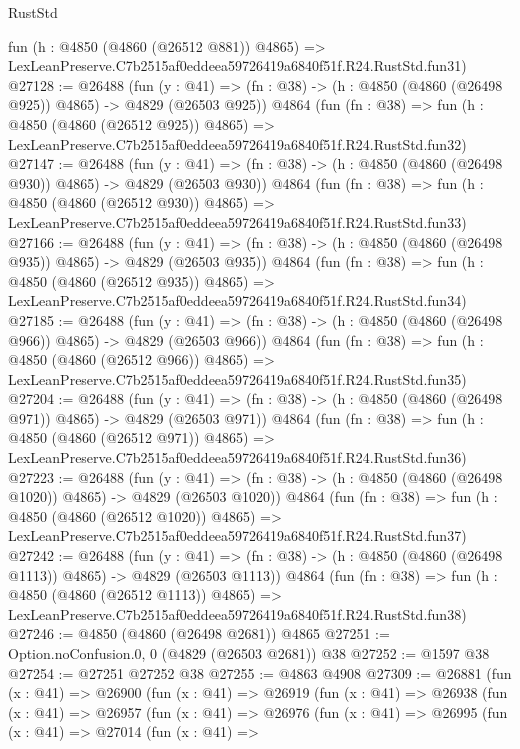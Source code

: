 \begin{lexlean}{RustStd}
\begin{coremodule}
    fun (h : @4850 (@4860 (@26512 @881)) @4865) =>
    LexLeanPreserve.C7b2515af0eddeea59726419a6840f51f.R24.RustStd.fun31)
@27128 := @26488
    (fun (y : @41) => (fn : @38) -> (h : @4850 (@4860 (@26498 @925)) @4865) -> @4829 (@26503 @925))
    @4864
    (fun (fn : @38) =>
    fun (h : @4850 (@4860 (@26512 @925)) @4865) =>
    LexLeanPreserve.C7b2515af0eddeea59726419a6840f51f.R24.RustStd.fun32)
@27147 := @26488
    (fun (y : @41) => (fn : @38) -> (h : @4850 (@4860 (@26498 @930)) @4865) -> @4829 (@26503 @930))
    @4864
    (fun (fn : @38) =>
    fun (h : @4850 (@4860 (@26512 @930)) @4865) =>
    LexLeanPreserve.C7b2515af0eddeea59726419a6840f51f.R24.RustStd.fun33)
@27166 := @26488
    (fun (y : @41) => (fn : @38) -> (h : @4850 (@4860 (@26498 @935)) @4865) -> @4829 (@26503 @935))
    @4864
    (fun (fn : @38) =>
    fun (h : @4850 (@4860 (@26512 @935)) @4865) =>
    LexLeanPreserve.C7b2515af0eddeea59726419a6840f51f.R24.RustStd.fun34)
@27185 := @26488
    (fun (y : @41) => (fn : @38) -> (h : @4850 (@4860 (@26498 @966)) @4865) -> @4829 (@26503 @966))
    @4864
    (fun (fn : @38) =>
    fun (h : @4850 (@4860 (@26512 @966)) @4865) =>
    LexLeanPreserve.C7b2515af0eddeea59726419a6840f51f.R24.RustStd.fun35)
@27204 := @26488
    (fun (y : @41) => (fn : @38) -> (h : @4850 (@4860 (@26498 @971)) @4865) -> @4829 (@26503 @971))
    @4864
    (fun (fn : @38) =>
    fun (h : @4850 (@4860 (@26512 @971)) @4865) =>
    LexLeanPreserve.C7b2515af0eddeea59726419a6840f51f.R24.RustStd.fun36)
@27223 := @26488
    (fun (y : @41) =>
    (fn : @38) -> (h : @4850 (@4860 (@26498 @1020)) @4865) -> @4829 (@26503 @1020))
    @4864
    (fun (fn : @38) =>
    fun (h : @4850 (@4860 (@26512 @1020)) @4865) =>
    LexLeanPreserve.C7b2515af0eddeea59726419a6840f51f.R24.RustStd.fun37)
@27242 := @26488
    (fun (y : @41) =>
    (fn : @38) -> (h : @4850 (@4860 (@26498 @1113)) @4865) -> @4829 (@26503 @1113))
    @4864
    (fun (fn : @38) =>
    fun (h : @4850 (@4860 (@26512 @1113)) @4865) =>
    LexLeanPreserve.C7b2515af0eddeea59726419a6840f51f.R24.RustStd.fun38)
@27246 := @4850 (@4860 (@26498 @2681)) @4865
@27251 := Option.noConfusion.{0, 0} (@4829 (@26503 @2681)) @38
@27252 := @1597 @38
@27254 := @27251 @27252 @38
@27255 := @4863 @4908
@27309 := @26881
    (fun (x : @41) =>
    @26900
      (fun (x : @41) =>
      @26919
        (fun (x : @41) =>
        @26938
          (fun (x : @41) =>
          @26957
            (fun (x : @41) =>
            @26976
              (fun (x : @41) =>
              @26995
                (fun (x : @41) =>
                @27014
                  (fun (x : @41) =>

\end{coremodule}
\end{lexlean}
